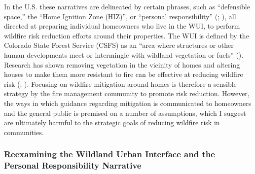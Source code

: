 \documentclass[
]{article}
\begin{document}
In the U.S. these narratives are delineated by certain phrases, such as ``defensible space,'' the ``Home Ignition Zone (HIZ)'', or ``personal responsibility'' (; ), all directed at preparing individual homeowners who live in the WUI, to perform wildfire risk reduction efforts around their properties. The WUI is defined by the Colorado State Forest Service (CSFS) as an ``area where structures or other human developments meet or intermingle with wildland vegetation or fuels'' (). Research has shown removing vegetation in the vicinity of homes and altering houses to make them more resistant to fire can be effective at reducing wildfire risk (; ). Focusing on wildfire mitigation around homes is therefore a sensible strategy by the fire management community to promote risk reduction. However, the ways in which guidance regarding mitigation is communicated to homeowners and the general public is premised on a number of assumptions, which I suggest are ultimately harmful to the strategic goals of reducing wildfire risk in communities.

\subsubsection{Reexamining the Wildland Urban Interface and the Personal Responsibility Narrative}\label{reexamining-the-wildland-urban-interface-and-the-personal-responsibility-narrative}
\end{document}

